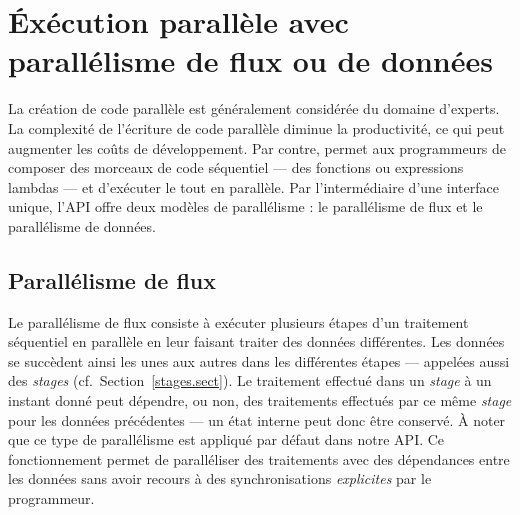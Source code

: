 \section{\'Ex\'ecution parall\`ele avec parall\'elisme de flux ou de donn\'ees}

La cr\'eation de code parall\`ele est g\'en\'eralement consid\'er\'ee du domaine d'experts. La complexit\'e de l'\'ecriture de code parall\`ele diminue la productivit\'e, ce qui peut augmenter les co\^uts de d\'eveloppement. Par contre,  permet aux programmeurs de composer des morceaux de code s\'equentiel --- des fonctions ou expressions lambdas --- et d'ex\'ecuter le tout en parall\`ele. Par l'interm\'ediaire d'une interface unique, l'API offre deux mod\`eles de parall\'elisme : le parall\'elisme de flux et le parall\'elisme de donn\'ees.






\subsection{Parall\'elisme de flux}

Le parall\'elisme de flux consiste \`a ex\'ecuter plusieurs \'etapes d'un traitement s\'equentiel en parall\`ele en leur faisant traiter des donn\'ees diff\'erentes. Les donn\'ees se succ\`edent ainsi les unes aux autres dans les diff\'erentes \'etapes --- appel\'ees  aussi des \emph{stages} (cf.~Section~\ref{stages.sect}).
%
Le traitement effectu\'e dans un \emph{stage} \`a un instant donn\'e peut d\'ependre, ou non, des traitements effectu\'es par ce m\^eme \emph{stage} pour les donn\'ees pr\'ec\'edentes --- un \'etat interne peut donc \^etre conserv\'e. 
%
\`A noter que ce type de parall\'elisme est appliqu\'e par d\'efaut dans notre API. 
%
Ce fonctionnement permet de parall\'eliser des traitements avec des d\'ependances entre les donn\'ees sans avoir recours \`a des synchronisations \emph{explicites} par le programmeur. 

